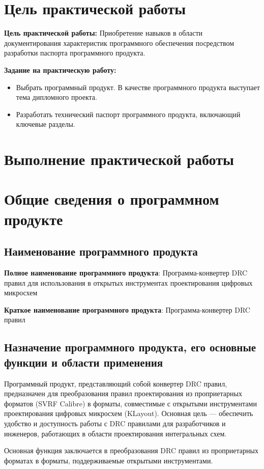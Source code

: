 \section*{\LARGE Цель практической работы}

\textbf{Цель практической работы:}
Приобретение навыков в области документирования характеристик
программного обеспечения посредством разработки
паспорта программного продукта.

\textbf{Задание на практическую работу:}

\begin{itemize}
	\item Выбрать программный продукт. В качестве программного продукта
		выступает тема дипломного проекта.
	\item Разработать технический паспорт программного продукта,
		включающий ключевые разделы.
\end{itemize}

\clearpage

\section*{\LARGE Выполнение практической работы}

\section{Общие сведения о программном продукте}

\subsection{Наименование программного продукта}

\textbf{Полное наименование программного продукта}:
Программа-конвертер DRC правил для использования
в открытых инструментах проектирования цифровых микросхем\par
\textbf{Краткое наименование программного продукта}:
Программа-конвертер DRC правил

\subsection{Назначение программного продукта,
	его основные функции и области применения}

Программный продукт, представляющий собой конвертер DRC правил,
предназначен для преобразования правил проектирования
из проприетарных форматов (SVRF Calibre) в форматы, совместимые
с открытыми инструментами проектирования цифровых микросхем (KLayout).
Основная цель --- обеспечить удобство
и доступность работы с DRC правилами для разработчиков и инженеров,
работающих в области проектирования интегральных схем.\par
Основная функция заключается в преобразования DRC правил
из проприетарных форматах в форматы,
поддерживаемые открытыми инструментами.

